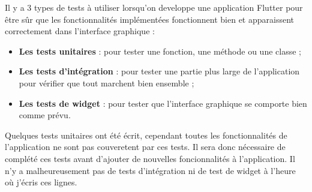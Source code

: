 Il y a 3 types de tests à utiliser lorsqu'on developpe une application Flutter pour être sûr que les fonctionnalités implémentées fonctionnent bien et apparaissent correctement dans l'interface graphique :
\begin{itemize}
  \item \textbf{Les tests unitaires} : pour tester une fonction, une méthode ou une classe ;
  \item \textbf{Les tests d'intégration} : pour tester une partie plus large de l'application pour vérifier que tout marchent bien ensemble ;
  \item \textbf{Les tests de widget} : pour tester que l'interface graphique se comporte bien comme prévu.
\end{itemize}

Quelques tests unitaires ont été écrit, cependant toutes les fonctionnalités de l'application ne sont pas couveretent par ces tests. Il sera donc nécessaire de complété ces tests avant d'ajouter de nouvelles foncionnalités à l'application. Il n'y a malheureusement pas de tests d'intégration ni de test de widget à l'heure où j'écris ces lignes.





